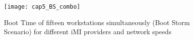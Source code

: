 \begin{figure}[htbp]
	\centering
	\texttt{[image: cap5\_BS\_combo]}
	\caption{Boot Time of fifteen workstations simultaneously (Boot Storm Scenario) for different iMI providers and network speeds}
	\label{fig:bootstorm_time}
\end{figure}



